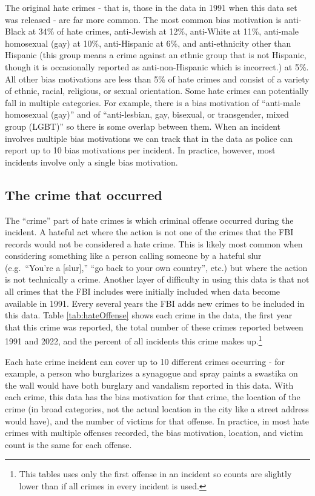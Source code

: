 \documentclass[
]{krantz}
\begin{document}
The original hate crimes - that is, those in the data in
1991 when this data set was released - are far more common.
The most common bias motivation is anti-Black at 34\% of
hate crimes, anti-Jewish at 12\%, anti-White at 11\%,
anti-male homosexual (gay) at 10\%, anti-Hispanic at 6\%,
and anti-ethnicity other than Hispanic (this group means a
crime against an ethnic group that is not Hispanic, though
it is occasionally reported as anti-non-Hispanic which is
incorrect.) at 5\%. All other bias motivations are less than
5\% of hate crimes and consist of a variety of ethnic,
racial, religious, or sexual orientation. Some hate crimes
can potentially fall in multiple categories. For example,
there is a bias motivation of ``anti-male homosexual (gay)''
and of ``anti-lesbian, gay, bisexual, or transgender, mixed
group (LGBT)'' so there is some overlap between them. When
an incident involves multiple bias motivations we can track
that in the data as police can report up to 10 bias
motivations per incident. In practice, however, most
incidents involve only a single bias motivation.

\subsection{The crime that
occurred}\label{the-crime-that-occurred}

The ``crime'' part of hate crimes is which criminal offense
occurred during the incident. A hateful act where the action
is not one of the crimes that the FBI records would not be
considered a hate crime. This is likely most common when
considering something like a person calling someone by a
hateful slur (e.g.~``You're a {[}slur{]},'' ``go back to
your own country'', etc.) but where the action is not
technically a crime. Another layer of difficulty in using
this data is that not all crimes that the FBI includes were
initially included when data become available in 1991. Every
several years the FBI adds new crimes to be included in this
data. Table \ref{tab:hateOffense} shows each crime in the
data, the first year that this crime was reported, the total
number of these crimes reported between 1991 and 2022, and
the percent of all incidents this crime makes up.\footnote{This
  tables uses only the first offense in an incident so
  counts are slightly lower than if all crimes in every
  incident is used.}

Each hate crime incident can cover up to 10 different crimes
occurring - for example, a person who burglarizes a
synagogue and spray paints a swastika on the wall would have
both burglary and vandalism reported in this data. With each
crime, this data has the bias motivation for that crime, the
location of the crime (in broad categories, not the actual
location in the city like a street address would have), and
the number of victims for that offense. In practice, in most
hate crimes with multiple offenses recorded, the bias
motivation, location, and victim count is the same for each
offense.
\end{document}
